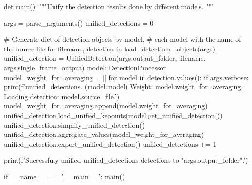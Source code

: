 \startPY
def main():
    """Unify the detection results done by different models.
    """

    args = parse_arguments()
    unified_detections = 0

    # Generate dict of detection objects by model, 
    # each model with the name of the source file
    for filename, detection in load_detections_objects(args):
        unified_detection = UnifiedDetection(args.output_folder, filename, args.single_frame_output)
        model: DetectionProcessor
        model_weight_for_averaging = []
        for model in detection.values():
            if args.verbose:
                print(f'{unified_detections}. ({model.model}) 
                Weight: {model.weight_for_averaging}, 
                Loading detection: {model.source_file}.')
            model_weight_for_averaging.append(model.weight_for_averaging)
            unified_detection.load_unified_kepoints(model.get_unified_detection())
        unified_detection.simplify_unified_detection()
        unified_detection.aggregate_values(model_weight_for_averaging)
        unified_detection.export_unified_detection()
        unified_detections += 1


    print(f'Successfuly unified {unified_detections} detections
    to "{args.output_folder}".')

if __name__ == '__main__':
    main()
\stopPY
\stopbuffer
